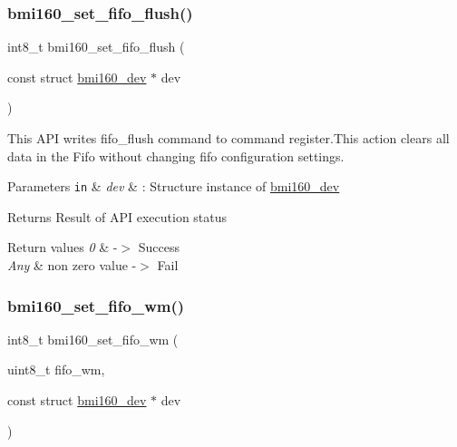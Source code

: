 \subsubsection{\texorpdfstring{bmi160\+\_\+set\+\_\+fifo\+\_\+flush()}{bmi160\_set\_fifo\_flush()}}
{\footnotesize\ttfamily int8\+\_\+t bmi160\+\_\+set\+\_\+fifo\+\_\+flush (\begin{DoxyParamCaption}\item[{const struct \hyperlink{structbmi160__dev}{bmi160\+\_\+dev} $\ast$}]{dev }\end{DoxyParamCaption})}



This A\+PI writes fifo\+\_\+flush command to command register.\+This action clears all data in the Fifo without changing fifo configuration settings. 


\begin{DoxyParams}[1]{Parameters}
\mbox{\tt in}  & {\em dev} & \+: Structure instance of \hyperlink{structbmi160__dev}{bmi160\+\_\+dev}\\
\hline
\end{DoxyParams}
\begin{DoxyReturn}{Returns}
Result of A\+PI execution status 
\end{DoxyReturn}

\begin{DoxyRetVals}{Return values}
{\em 0} & -\/$>$ Success \\
\hline
{\em Any} & non zero value -\/$>$ Fail \\
\hline
\end{DoxyRetVals}
\mbox{\label{group__bmi160_gaa348ae8d5aa3b20363b49876abff5c69}} 
\subsubsection{\texorpdfstring{bmi160\+\_\+set\+\_\+fifo\+\_\+wm()}{bmi160\_set\_fifo\_wm()}}
{\footnotesize\ttfamily int8\+\_\+t bmi160\+\_\+set\+\_\+fifo\+\_\+wm (\begin{DoxyParamCaption}\item[{uint8\+\_\+t}]{fifo\+\_\+wm,  }\item[{const struct \hyperlink{structbmi160__dev}{bmi160\+\_\+dev} $\ast$}]{dev }\end{DoxyParamCaption})}



